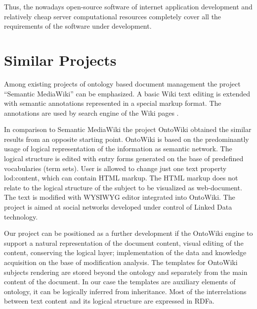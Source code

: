 \documentclass[conference]{IEEEtran}
\begin{document}
Thus, the nowadays open-source software of internet application development and relatively cheap server computational resources completely cover all the requirements of the software under development.

\section{Similar Projects}
\label{sec:similar-projects}

Among existing projects of ontology based document management the project “Semantic MediaWiki” can be emphasized. A basic Wiki text editing is extended with semantic annotations represented in a special markup format. The annotations are used by search engine of the Wiki pages \cite{mediawiki}.

In comparison to Semantic MediaWiki the project OntoWiki \cite{heino} obtained the similar results from an opposite starting point. OntoWiki is based on the predominantly usage of logical representation of the information as semantic network. The logical structure is edited with entry forms generated on the base of predefined vocabularies (term sets). User is allowed to change just one text property lod:content, which can contain HTML markup. The HTML markup does not relate to the logical structure of the subject to be visualized as web-document. The text is modified with WYSIWYG editor integrated into OntoWiki. The project is aimed at social networks developed under control of Linked Data technology.

Our project can be positioned as a further development if the OntoWiki engine to support a natural representation of the document content, visual editing of the content, conserving the logical layer; implementation of the data and knowledge acquisition on the base of modification analysis. The templates for OntoWiki subjects rendering are stored beyond the ontology and separately from the main content of the document. In our case the templates are auxiliary elements of ontology, it can be logically inferred from inheritance. Most of the interrelations between text content and its logical structure are expressed in RDFa.
\end{document}
